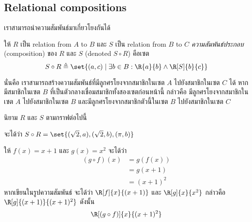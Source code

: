 \subsection{Relational compositions}
เราสามารถนำความสัมพันธ์มาเกี่ยวโยงกันได้
\begin{definition}
ให้ $R$ เป็น relation from $A$ to $B$ และ $S$ เป็น relation from $B$ to $C$ \enskip \emph{ความสัมพันธ์ประกอบ} (composition) ของ $R$ และ $S$ (denoted $S\circ R$) คือเซต \[S\circ R\triangleq\set{(a,c)\mid\exists b\in B: \R{a}{b} \wedge \R[S]{b}{c}}\]
\end{definition}
นั่นคือ เราสามารถสร้างความสัมพันธ์ที๋มีลูกศรโยงจากสมาชิกในเซต $A$ ไปยังสมาชิกในเซต $C$ ได้ หากมีสมาชิกในเซต $B$ ที่เป็นตัวกลางเชื่อมสมาชิกทั้งสองเซตก่อนหน้านี้ กล่าวคือ มีลูกศรโยงจากสมาชิกในเซต $A$ ไปยังสมาชิกในเซต $B$ และมีลูกศรโยงจากสมาชิกตัวนี้ในเซต $B$ ไปยังสมาชิกในเซต $C$
%
\begin{example}
นิยาม $R$ และ $S$ ตามกราฟต่อไปนี้
\begin{center}
\end{center}
จะได้ว่า $S\circ R=\set{(\sqrt{2},a),(\sqrt{2},b),(\pi,b)}$
\end{example}
%
\begin{example}
ให้ $f(x)=x+1$ และ $g(x)=x^2$ จะได้ว่า
\begin{align*}
(g\circ f)(x)
&= g(f(x)) \\
&= g(x+1) \\
&= (x+1)^2
\end{align*}
หากเขียนในรูปความสัมพันธ์ จะได้ว่า $\R[f]{x}{(x+1)}$ และ $\R[g]{x}{x^2}$ กล่าวคือ $\R[g]{(x+1)}{(x+1)^2}$ \enskip ดังนั้น \[\R[(g\circ f)]{x}{(x+1)^2}\]
\end{example}

